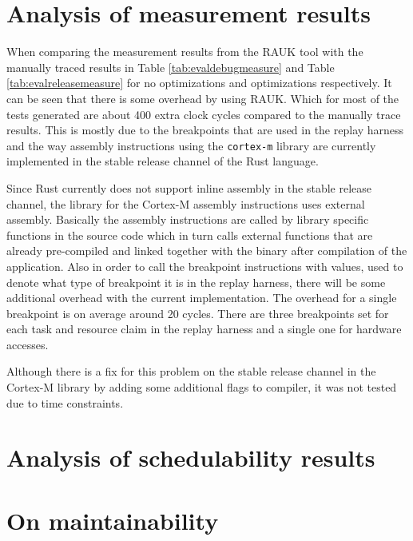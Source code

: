 \section{Analysis of measurement results}
When comparing the measurement results from the RAUK tool with the manually
traced results in Table \ref{tab:evaldebugmeasure} and Table
\ref{tab:evalreleasemeasure} for no optimizations and optimizations
respectively. It can be seen that there is some overhead by using RAUK. Which
for most of the tests generated are about 400 extra clock cycles compared to
the manually trace results. This is mostly due to the breakpoints that are used
in the replay harness and the way assembly instructions using the
\texttt{cortex-m} library are currently implemented in the stable release
channel of the Rust language.

Since Rust currently does not support inline assembly in the stable release
channel, the library for the Cortex-M assembly instructions uses external
assembly. Basically the assembly instructions are called by library specific
functions in the source code which in turn calls external functions that are
already pre-compiled and linked together with the binary after compilation of
the application. Also in order to call the breakpoint instructions with values,
used to denote what type of breakpoint it is in the replay harness, there will
be some additional overhead with the current implementation. The overhead for a
single breakpoint is on average around 20 cycles. There are three breakpoints
set for each task and resource claim in the replay harness and a single one for
hardware accesses.

Although there is a fix for this problem on the stable release channel in the
Cortex-M library by adding some additional flags to compiler, it was not
tested due to time constraints.

\section{Analysis of schedulability results}


\section{On maintainability}

